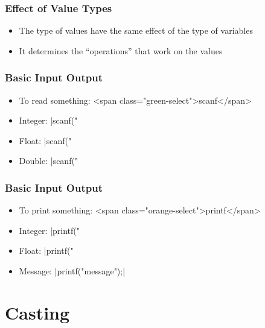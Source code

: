 \documentclass{../c-lecture}
\begin{document}
\begin{frame}
  \frametitle{Effect of Value Types}
  \begin{itemize}
    \item The type of values have the same effect of the type of variables
    \item It determines the “operations” that work on the values
  \end{itemize}
\end{frame}

\begin{frame}
  \frametitle{Basic Input Output}
  \begin{itemize}
    \item To read something: <span class="green-select">scanf</span>
    \item Integer: |scanf("%
    \item Float: |scanf("%
    \item Double: |scanf("%
  \end{itemize}
\end{frame}

\begin{frame}
  \frametitle{Basic Input Output}
  \begin{itemize}
    \item To print something: <span class="orange-select">printf</span>
    \item Integer: |printf("%
    \item Float: |printf("%
    \item Message: |printf("message");|
  \end{itemize}
\end{frame}

\section{Casting}
\end{document}

